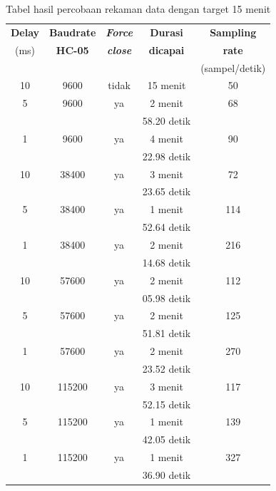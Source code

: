 \begin{table}[H]
	\caption{Tabel hasil percobaan rekaman data dengan target 15 menit}
	\begin{tabular}{|c|c|c|c|c|}
		\hline
		\multicolumn{1}{|c|}{{\color[HTML]{000000} \textbf{Delay}}} & \multicolumn{1}{|c|}{\textbf{Baudrate}} &
		\multicolumn{1}{|c|}{ \textbf{\textit{Force}}} &
		\multicolumn{1}{|c|}{\textbf{Durasi}} &
		\multicolumn{1}{|c|}{\textbf{Sampling}}  \\
		(ms) &  \textbf{HC-05}  & \textbf{\textit{close}}  & \textbf{dicapai} & \textbf{rate}  \\
		&  &  &   & (sampel/detik)  \\ \hline
		
		10 & 9600 & tidak & 15 menit & 50  \\ \hline
		5 & 9600 & ya & 2 menit & 68  \\
		& & & 58.20 detik & \\ \hline
		1 & 9600 & ya & 4 menit & 90  \\ & & & 22.98 detik & \\\hline
		10 & 38400 & ya & 3 menit & 72  \\ & & & 23.65 detik & \\\hline
		5 & 38400 & ya & 1 menit & 114  \\ & & & 52.64 detik & \\ \hline
		1 & 38400 & ya & 2 menit & 216  \\ & & & 14.68 detik & \\ \hline
		10 & 57600 & ya & 2 menit & 112  \\ & & & 05.98 detik & \\ \hline
		5 & 57600 & ya & 2 menit & 125  \\ & & & 51.81 detik & \\ \hline
		1 & 57600 & ya & 2 menit & 270  \\ & & & 23.52 detik & \\ \hline
		10 & 115200 & ya & 3 menit & 117  \\ & & & 52.15 detik & \\ \hline
		5 & 115200 & ya & 1 menit & 139  \\ & & & 42.05 detik & \\ \hline
		1 & 115200 & ya & 1 menit & 327  \\ & & & 36.90 detik & \\ \hline
		
	\end{tabular}
	\vspace{1ex}
	
	\label{tabel:4.0.0}
\end{table}


